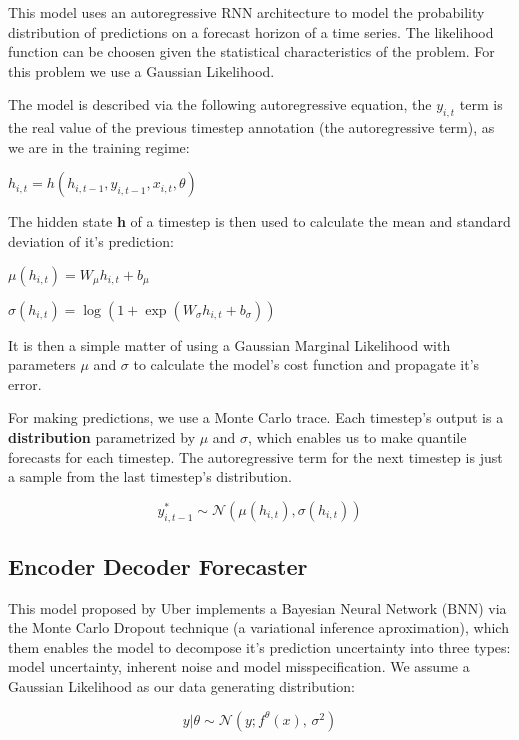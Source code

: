 \documentclass[a4paper]{article}
\begin{document}
This model uses an autoregressive RNN architecture to model the probability distribution of predictions on a forecast horizon of a time series. The likelihood function can be choosen given the statistical
characteristics of the problem. For this problem we use a Gaussian Likelihood.

The model is described via the following autoregressive equation, the \(y_{i,t}\) term is the real value of the previous timestep annotation (the autoregressive term), as we are in the training regime:

\begin{center}
\(h_{i,t} = h(h_{i,t-1},y_{i,t-1},x_{i,t}, \theta)\)
\end{center}
The hidden state \textbf{\textbf{h}} of a timestep is then used to calculate the mean 
and standard deviation of it's prediction:

\begin{center}
\(\mu(h_{i,t}) = W_{\mu}h_{i,t} + b_{\mu}\) 

\(\sigma(h_{i,t}) = \log(1 + \exp(W_{\sigma}h_{i,t}+ b_{\sigma}))\) 
\end{center}
It is then a simple matter of using a Gaussian Marginal Likelihood with parameters \(\mu\) and \(\sigma\) to 
calculate the model's cost function and propagate it's error.

For making predictions, we use a Monte Carlo trace. Each timestep's output is a \textbf{\textbf{distribution}} parametrized by \(\mu\) and \(\sigma\), which enables us to make quantile forecasts for each timestep.
The autoregressive term for the next timestep is just a sample from the last timestep's distribution.

\[ y^*_{i,t-1}  \sim \mathcal{N}(\mu(h_{i,t}),\sigma(h_{i,t})) \]



\subsection{Encoder Decoder Forecaster \cite{ubertime}}
\label{sec:org6cbdba3}
This model proposed by Uber implements a Bayesian Neural Network (BNN) via the Monte Carlo Dropout technique (a variational inference aproximation),
which them enables the model to decompose it's prediction uncertainty into three types:
model uncertainty, inherent noise and model misspecification. We assume a Gaussian Likelihood as
our data generating distribution: 

\begin{equation}
y| \theta \sim \mathcal{N}(y;f^{\theta}(x),\,\sigma^2)
\end{equation}
\end{document}
